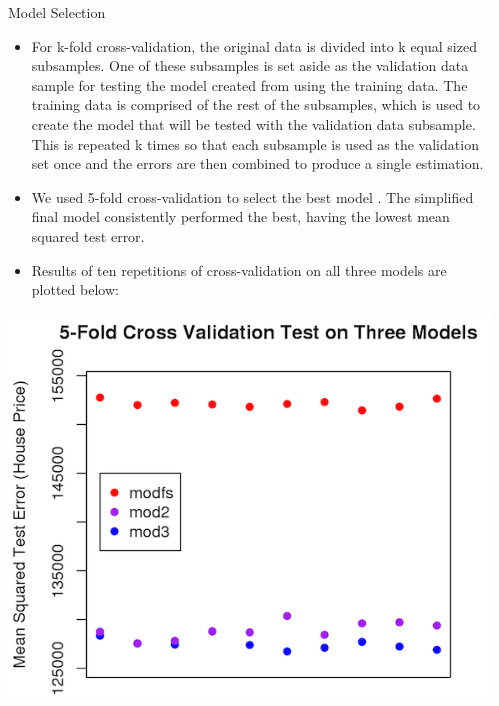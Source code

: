 \documentclass[final]{beamer}
\begin{document}
\begin{frame}[fragile]
\begin{columns}[t]
\begin{column}{0.31\linewidth}
\begin{minipage}[t][.955\textheight]{\linewidth}
\end{minipage}
\end{column}%

\begin{column}{0.31\linewidth}
\begin{minipage}[t][.955\textheight]{\linewidth} 
\begin{block}{Model Selection}
\begin{itemize}
\item For k-fold cross-validation, the original data is divided into k equal sized subsamples.  One of these subsamples is set aside as the validation data sample for testing the model created from using the training data. The training data is comprised of the rest of the subsamples, which is used to create the model that will be tested with the validation data subsample. This is repeated k times so that each subsample is used as the validation set once and the errors are then combined to produce a single estimation.
\item We used 5-fold cross-validation to select the best model \cite{R-boot}. The simplified final model consistently performed the best, having the lowest mean squared test error.
\item Results of ten repetitions of cross-validation on all three models are plotted below:
\end{itemize}

\centering
\includegraphics{cvplot.png}
\vspace{0ex}
\end{block}
\vfill



\end{minipage}
\end{column}
\end{columns}
\end{frame}
\end{document}
